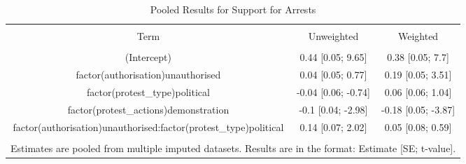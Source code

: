 
\begin{table}[!htbp] \centering 
  \caption{Pooled Results for Support for Arrests} 
  \label{} 
\begin{tabular}{@{\extracolsep{5pt}} ccc} 
\\[-1.8ex]\hline 
\hline \\[-1.8ex] 
Term & Unweighted & Weighted \\ 
\hline \\[-1.8ex] 
(Intercept) & 0.44 [0.05; 9.65] & 0.38 [0.05; 7.7] \\ 
factor(authorisation)unauthorised & 0.04 [0.05; 0.77] & 0.19 [0.05; 3.51] \\ 
factor(protest\_type)political & -0.04 [0.06; -0.74] & 0.06 [0.06; 1.04] \\ 
factor(protest\_actions)demonstration & -0.1 [0.04; -2.98] & -0.18 [0.05; -3.87] \\ 
factor(authorisation)unauthorised:factor(protest\_type)political & 0.14 [0.07; 2.02] & 0.05 [0.08; 0.59] \\ 
\hline \\[-1.8ex] 
\multicolumn{3}{l}{Estimates are pooled from multiple imputed datasets. Results are in the format: Estimate [SE; t-value].} \\ 
\end{tabular} 
\end{table} 
